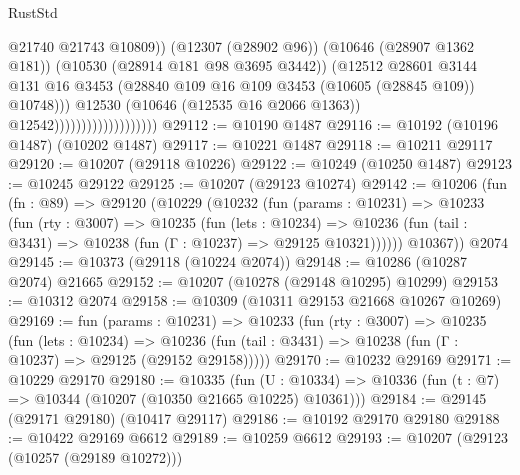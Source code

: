 \begin{lexlean}{RustStd}
\begin{coremodule}
                                                @21740
                                                @21743
                                                @10809))
                                            (@12307 (@28902 @96))
                                            (@10646 (@28907 @1362 @181))
                                            (@10530 (@28914 @181 @98 @3695 @3442))
                                            (@12512
                                              @28601
                                              @3144
                                              @131
                                              @16
                                              @3453
                                              (@28840
                                                @109
                                                @16
                                                @109
                                                @3453
                                                (@10605 (@28845 @109))
                                                @10748)))
                                          @12530
                                          (@10646 (@12535 @16 @2066 @1363))
                                          @12542)))))))))))))))))))
@29112 := @10190 @1487
@29116 := @10192 (@10196 @1487) (@10202 @1487)
@29117 := @10221 @1487
@29118 := @10211 @29117
@29120 := @10207 (@29118 @10226)
@29122 := @10249 (@10250 @1487)
@29123 := @10245 @29122
@29125 := @10207 (@29123 @10274)
@29142 := @10206
    (fun (fn : @89) =>
    @29120
      (@10229
        (@10232
          (fun (params : @10231) =>
          @10233
            (fun (rty : @3007) =>
            @10235
              (fun (lets : @10234) =>
              @10236 (fun (tail : @3431) => @10238 (fun (Γ : @10237) => @29125 @10321))))))
        @10367))
    @2074
@29145 := @10373 (@29118 (@10224 @2074))
@29148 := @10286 (@10287 @2074) @21665
@29152 := @10207 (@10278 (@29148 @10295) @10299)
@29153 := @10312 @2074
@29158 := @10309 (@10311 @29153 @21668 @10267 @10269)
@29169 := fun (params : @10231) =>
  @10233
    (fun (rty : @3007) =>
    @10235
      (fun (lets : @10234) =>
      @10236 (fun (tail : @3431) => @10238 (fun (Γ : @10237) => @29125 (@29152 @29158)))))
@29170 := @10232 @29169
@29171 := @10229 @29170
@29180 := @10335
    (fun (U : @10334) => @10336 (fun (t : @7) => @10344 (@10207 (@10350 @21665 @10225) @10361)))
@29184 := @29145 (@29171 @29180) (@10417 @29117)
@29186 := @10192 @29170 @29180
@29188 := @10422 @29169 @6612
@29189 := @10259 @6612
@29193 := @10207 (@29123 (@10257 (@29189 @10272)))

\end{coremodule}
\end{lexlean}
